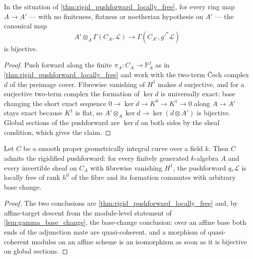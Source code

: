 \begin{lemma}\leanok
  \label{lem:gamma_base_change}
  In the situation of \cref{thm:rigid_pushforward_locally_free}, for every ring
  map \(A \to A'\) --- with no finiteness, flatness or noetherian hypothesis on
  \(A'\) --- the canonical map
  \[
    A' \otimes_A \Gamma(C_A, \mathcal{L})
      \longrightarrow \Gamma(C_{A'}, g'^* \mathcal{L})
  \]
  is bijective.
\end{lemma}

\begin{proof}\leanok
  Push forward along the finite \(\pi_A : C_A \to \mathbb{P}^1_A\) as in
  \cref{thm:rigid_pushforward_locally_free} and work with the two-term {\v C}ech
  complex \(d\) of the preimage cover. Fibrewise vanishing of \(H^1\) makes \(d\)
  surjective, and for a surjective two-term complex the formation of \(\ker d\)
  is universally exact: base changing the short exact sequence
  \(0 \to \ker d \to K^0 \to K^1 \to 0\) along \(A \to A'\) stays exact because
  \(K^1\) is flat, so \(A' \otimes_A \ker d \to \ker(d \otimes A')\) is
  bijective. Global sections of the pushforward are \(\ker d\) on both sides by
  the sheaf condition, which gives the claim.
\end{proof}

\begin{theorem}\leanok
  \label{thm:rigid_pushforward_gate}
  Let \(C\) be a smooth proper geometrically integral curve over a field \(k\).
  Then \(C\) admits the rigidified pushforward: for every finitely generated
  \(k\)-algebra \(A\) and every invertible sheaf on \(C_A\) with fibrewise
  vanishing \(H^1\), the pushforward \(q_* \mathcal{L}\) is locally free of rank
  \(h^0\) of the fibre and its formation commutes with arbitrary base change.
\end{theorem}

\begin{proof}\leanok
  The two conclusions are \cref{thm:rigid_pushforward_locally_free} and, by
  affine-target descent from the module-level statement of
  \cref{lem:gamma_base_change}, the base-change conclusion: over an affine base
  both ends of the adjunction mate are quasi-coherent, and a morphism of
  quasi-coherent modules on an affine scheme is an isomorphism as soon as it is
  bijective on global sections.
\end{proof}

